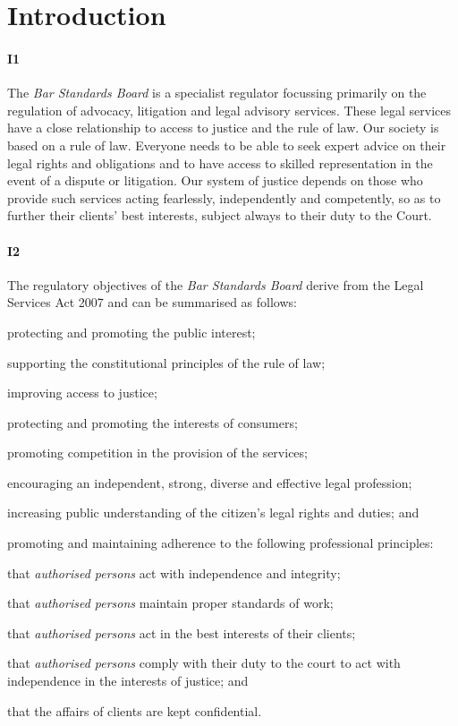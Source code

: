 \part{Introduction}

\subsection{I1}

The \emph{Bar Standards Board} is a specialist regulator focussing
primarily on the regulation of advocacy, litigation and legal advisory
services. These legal services have a close relationship to access to
justice and the rule of law. Our society is based on a rule of law.
Everyone needs to be able to seek expert advice on their legal rights
and obligations and to have access to skilled representation in the
event of a dispute or litigation. Our system of justice depends on those
who provide such services acting fearlessly, independently and
competently, so as to further their clients' best interests, subject
always to their duty to the Court.

\subsection{I2}

The regulatory objectives of the \emph{Bar Standards Board} derive from
the Legal Services Act 2007 and can be summarised as follows:
\begin{numlist}\item protecting and promoting the public interest;
\item supporting the constitutional principles of the rule of law;
\item improving access to justice;
\item protecting and promoting the interests of consumers;
\item promoting competition in the provision of the services;
\item encouraging an independent, strong, diverse and effective legal
profession;
\item increasing public understanding of the citizen's legal rights and
duties; and
\item promoting and maintaining adherence to the following professional
principles:
\begin{alphlist}
\item that \emph{authorised persons} act with independence and integrity;

\item that \emph{authorised persons} maintain proper standards of work;

\item that \emph{authorised persons} act in the best interests of their
clients;

\item that \emph{authorised persons} comply with their duty to the court to
act with independence in the interests of justice; and

\item that the affairs of clients are kept confidential.
\end{alphlist}
\end{numlist}
